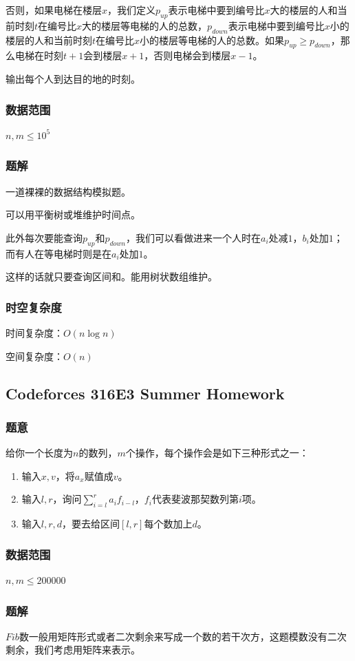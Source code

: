 \documentclass{ctexart}
\begin{document}
否则，如果电梯在楼层$x$，我们定义$p_{up}$表示电梯中要到编号比$x$大的楼层的人和当前时刻$t$在编号比$x$大的楼层等电梯的人的总数，$p_{down}$表示电梯中要到编号比$x$小的楼层的人和当前时刻$t$在编号比$x$小的楼层等电梯的人的总数。如果$p_{up} \ge p_{down}$，那么电梯在时刻$t+1$会到楼层$x+1$，否则电梯会到楼层$x-1$。

输出每个人到达目的地的时刻。
\subsubsection{数据范围}
$n,m \le 10^5$
\subsubsection{题解}
一道裸裸的数据结构模拟题。

可以用平衡树或堆维护时间点。

此外每次要能查询$p_{up}$和$p_{down}$，我们可以看做进来一个人时在$a_i$处减$1$，$b_i$处加$1$；而有人在等电梯时则是在$a_i$处加$1$。

这样的话就只要查询区间和。能用树状数组维护。
\subsubsection{时空复杂度}
时间复杂度：$O(n \log n)$

空间复杂度：$O(n)$
\subsection{Codeforces 316E3 Summer Homework}
\subsubsection{题意}
给你一个长度为$n$的数列，$m$个操作，每个操作会是如下三种形式之一：

\begin{enumerate}
\item 输入$x,v$，将$a_x$赋值成$v$。
\item 输入$l,r$，询问$\sum\limits_{i=l}^r a_i f_{i-l}$，$f_i$代表斐波那契数列第$i$项。
\item 输入$l,r,d$，要去给区间$[l,r]$每个数加上$d$。
\end{enumerate}
\subsubsection{数据范围}
$n,m \le 200000$
\subsubsection{题解}
$Fib$数一般用矩阵形式或者二次剩余来写成一个数的若干次方，这题模数没有二次剩余，我们考虑用矩阵来表示。
\end{document}
